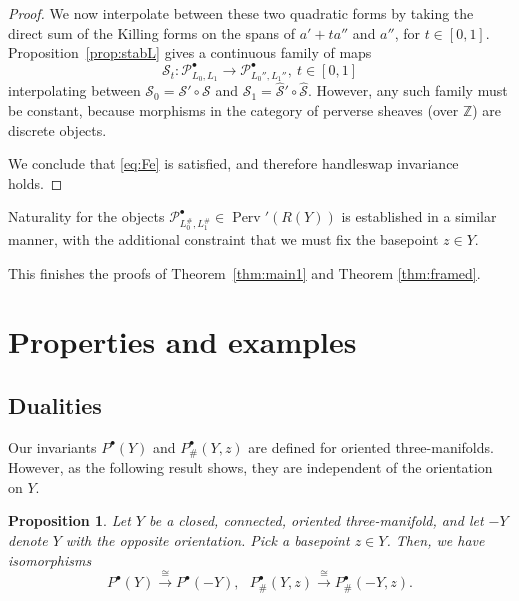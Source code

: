 \documentclass [11pt]{amsart}
\newtheorem {proposition}[theorem]{Proposition}
\theoremstyle{remark}
\def\zz {{\mathbb{Z}}}
\def\Z {\zz}
\def\Stab{\mathscr{S}}
\def\Perv {\operatorname{Perv}}
\def\Pb {\mathcal{P}^\bullet}
\begin{document}
\begin{proof}
We now interpolate between these two quadratic forms by taking the direct sum of the Killing forms on the spans of $a' + ta''$ and $a''$, for $t \in [0,1]$. Proposition~\ref{prop:stabL} gives a continuous family of maps 
$$ \Stab_t: \Pb_{L_0, L_1} \to \Pb_{L_0'', L_1''}, \ t \in [0,1]$$
interpolating between $\Stab_0=\Stab' \circ \Stab$ and $\Stab_1 = \hat{\Stab}' \circ \hat{\Stab}$. However, any such family must be constant, because morphisms in the category of perverse sheaves (over $\Z$) are discrete objects. 

We conclude that \eqref{eq:Fe} is satisfied, and therefore handleswap invariance holds.
\end{proof}

Naturality for the objects  $\Pb_{L^{\#}_0, L^{\#}_1} \in \Perv'(R(Y))$ is established in a similar manner, with the additional constraint that we must fix the basepoint $z \in Y$.

This finishes the proofs of Theorem~\ref{thm:main1} and Theorem \ref{thm:framed}. 



\section{Properties and examples}
\label{sec:Examples}


\subsection{Dualities}
Our invariants $P^{\bullet}(Y)$ and $P^{\bullet}_\#(Y,z)$ are defined for oriented three-manifolds. However, as the following result shows, they are independent of the orientation on $Y$. 
 
 \begin{proposition}
 Let $Y$ be a closed, connected, oriented three-manifold, and let $-Y$ denote $Y$ with the opposite orientation. Pick a basepoint $z \in Y$. Then, we have isomorphisms
 $$ P^{\bullet}(Y) \xrightarrow{\cong} P^{\bullet}(-Y), \ \ \ P^{\bullet}_\#(Y,z) \xrightarrow{\cong} P^{\bullet}_{\#}(-Y,z).$$
 \end{proposition}
 
\end{document}
